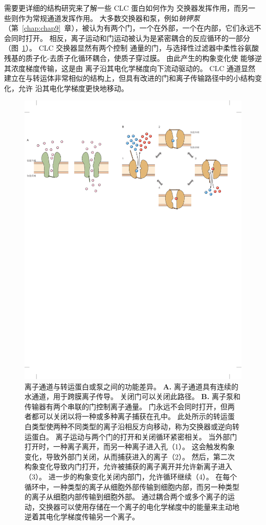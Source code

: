 需要更详细的结构研究来了解一些 CLC 蛋白如何作为  交换器发挥作用，而另一些则作为常规通道发挥作用。
大多数交换器和泵，例如\textit{钠钾泵}（第~\ref{chap:chap9}~章），被认为有两个门，一个在外部，一个在内部，它们永远不会同时打开。
相反，离子运动和门运动被认为是紧密耦合的反应循环的一部分（图~\ref{fig:8_16}）。
CLC 交换器显然有两个控制  通量的门，与选择性过滤器中柔性谷氨酸残基的质子化-去质子化循环耦合，使质子穿过膜。
由此产生的构象变化使  能够逆其浓度梯度传输，这是由  离子沿其电化学梯度向下流动驱动的。
CLC 通道显然建立在与转运体非常相似的结构上，但具有改进的门和离子传输路径中的小结构变化，允许  沿其电化学梯度更快地移动。


\begin{figure}[htbp]
	\centering
	\includegraphics[width=1.0\linewidth]{chap08/fig_8_16}
	\caption{离子通道与转运蛋白或泵之间的功能差异\cite{gadsby2004spot}。 
		\textbf{A.} 离子通道具有连续的水通道，用于跨膜离子传导。
		关闭门可以关闭此路径。
		\textbf{B.} 离子泵和传输器有两个串联的门控制离子通量。
		门永远不会同时打开，但两者都可以关闭以将一种或多种离子捕获在孔中。
		此处所示的转运蛋白类型使两种不同类型的离子沿相反方向移动，称为交换器或逆向转运蛋白。
		离子运动与两个门的打开和关闭循环紧密相关。
		当外部门打开时，一种离子离开，而另一种离子进入孔（1）。
		这会触发构象变化，导致外部门关闭，从而捕获进入的离子（2）。
		然后，第二次构象变化导致内门打开，允许被捕获的离子离开并允许新离子进入（3）。
		进一步的构象变化关闭内部门，允许循环继续（4）。
		在每个循环中，一种类型的离子从细胞外部传输到细胞内部，而另一种类型的离子从细胞内部传输到细胞外部。
		通过耦合两个或多个离子的运动，交换器可以使用存储在一个离子的电化学梯度中的能量来主动地逆着其电化学梯度传输另一个离子。}
	\label{fig:8_16}
\end{figure}
